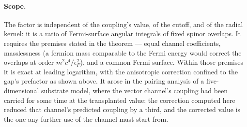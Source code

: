 \documentclass[11pt]{article}
\begin{document}
\paragraph{Scope.} The factor is independent of the coupling's value, of the cutoff, and of the radial kernel: it is a ratio of Fermi-surface angular integrals of fixed spinor overlaps. It requires the premises stated in the theorem --- equal channel coefficients, masslessness (a fermion mass comparable to the Fermi energy would correct the overlaps at order $m^2c^4/\epsilon_F^2$), and a common Fermi surface. Within those premises it is exact at leading logarithm, with the anisotropic correction confined to the gap's prefactor as shown above. It arose in the pairing analysis of a five-dimensional substrate model, where the vector channel's coupling had been carried for some time at the transplanted value; the correction computed here reduced that channel's predicted coupling by a third, and the corrected value is the one any further use of the channel must start from.
\end{document}
